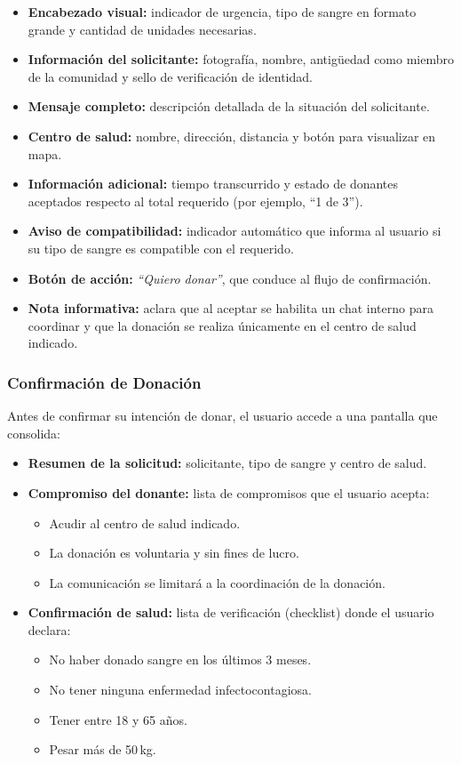 \documentclass[12pt, a4paper]{article}
\begin{document}
\begin{itemize}
    \item \textbf{Encabezado visual:} indicador de urgencia, tipo de sangre en formato grande y cantidad de unidades necesarias.
    \item \textbf{Información del solicitante:} fotografía, nombre, antigüedad como miembro de la comunidad y sello de verificación de identidad.
    \item \textbf{Mensaje completo:} descripción detallada de la situación del solicitante.
    \item \textbf{Centro de salud:} nombre, dirección, distancia y botón para visualizar en mapa.
    \item \textbf{Información adicional:} tiempo transcurrido y estado de donantes aceptados respecto al total requerido (por ejemplo, ``1 de 3'').
    \item \textbf{Aviso de compatibilidad:} indicador automático que informa al usuario si su tipo de sangre es compatible con el requerido.
    \item \textbf{Botón de acción:} \textit{``Quiero donar''}, que conduce al flujo de confirmación.
    \item \textbf{Nota informativa:} aclara que al aceptar se habilita un chat interno para coordinar y que la donación se realiza únicamente en el centro de salud indicado.
\end{itemize}

\subsubsection{Confirmación de Donación}

Antes de confirmar su intención de donar, el usuario accede a una pantalla que consolida:

\begin{itemize}
    \item \textbf{Resumen de la solicitud:} solicitante, tipo de sangre y centro de salud.
    \item \textbf{Compromiso del donante:} lista de compromisos que el usuario acepta:
    \begin{itemize}
        \item Acudir al centro de salud indicado.
        \item La donación es voluntaria y sin fines de lucro.
        \item La comunicación se limitará a la coordinación de la donación.
    \end{itemize}
    \item \textbf{Confirmación de salud:} lista de verificación (checklist) donde el usuario declara:
    \begin{itemize}
        \item No haber donado sangre en los últimos 3 meses.
        \item No tener ninguna enfermedad infectocontagiosa.
        \item Tener entre 18 y 65 años.
        \item Pesar más de 50\,kg.
    \end{itemize}
\end{itemize}
\end{document}
